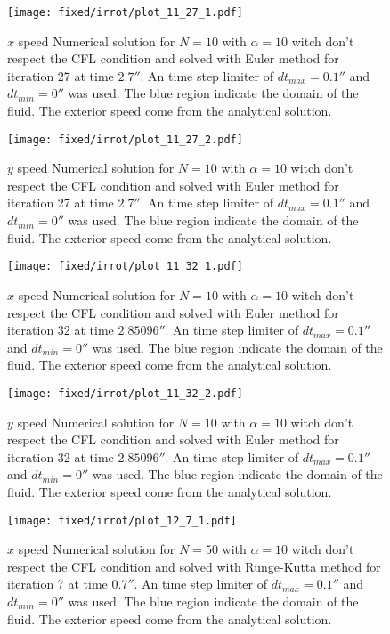 \begin{figure}
\texttt{[image: fixed/irrot/plot\_11\_27\_1.pdf]}
\caption{$x$ speed Numerical solution for $N=10$ with $\alpha=10$ witch don't respect the CFL condition and solved with Euler method
for iteration 27 at time $\unit{2.7}{\second}$.
An time step limiter of $dt_{max}=\unit{0.1}{\second}$ and $dt_{min}=\unit{0}{\second}$ was used.
The blue region indicate the domain of the fluid. The exterior speed come from the analytical solution.
}
\end{figure}

\begin{figure}
\texttt{[image: fixed/irrot/plot\_11\_27\_2.pdf]}
\caption{$y$ speed Numerical solution for $N=10$ with $\alpha=10$ witch don't respect the CFL condition and solved with Euler method
for iteration 27 at time $\unit{2.7}{\second}$.
An time step limiter of $dt_{max}=\unit{0.1}{\second}$ and $dt_{min}=\unit{0}{\second}$ was used.
The blue region indicate the domain of the fluid. The exterior speed come from the analytical solution.
}
\end{figure}
\begin{figure}
\texttt{[image: fixed/irrot/plot\_11\_32\_1.pdf]}
\caption{$x$ speed Numerical solution for $N=10$ with $\alpha=10$ witch don't respect the CFL condition and solved with Euler method
for iteration 32 at time $\unit{2.85096}{\second}$.
An time step limiter of $dt_{max}=\unit{0.1}{\second}$ and $dt_{min}=\unit{0}{\second}$ was used.
The blue region indicate the domain of the fluid. The exterior speed come from the analytical solution.
}
\end{figure}
\begin{figure}
\texttt{[image: fixed/irrot/plot\_11\_32\_2.pdf]}
\caption{$y$ speed Numerical solution for $N=10$ with $\alpha=10$ witch don't respect the CFL condition and solved with Euler method
for iteration 32 at time $\unit{2.85096}{\second}$.
An time step limiter of $dt_{max}=\unit{0.1}{\second}$ and $dt_{min}=\unit{0}{\second}$ was used.
The blue region indicate the domain of the fluid. The exterior speed come from the analytical solution.
}
\end{figure}
\begin{figure}
\texttt{[image: fixed/irrot/plot\_12\_7\_1.pdf]}
\caption{$x$ speed Numerical solution for $N=50$ with $\alpha=10$ witch don't respect the CFL condition and solved with Runge-Kutta method
for iteration 7 at time $\unit{0.7}{\second}$.
An time step limiter of $dt_{max}=\unit{0.1}{\second}$ and $dt_{min}=\unit{0}{\second}$ was used.
The blue region indicate the domain of the fluid. The exterior speed come from the analytical solution.
}
\end{figure}
